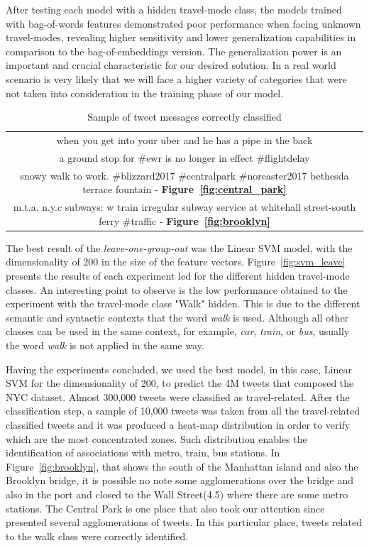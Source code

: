 After testing each model with a hidden travel-mode class, the models trained with bag-of-words features demonstrated poor performance when facing unknown travel-modes, revealing higher sensitivity and lower generalization capabilities in comparison to the bag-of-embeddings version. The generalization power is an important and crucial characteristic for our desired solution. In a real world scenario is very likely that we will face a higher variety of categories that were not taken into consideration in the training phase of our model.

\begin{table}[htbp]
	\centering
	\small
	\caption{Sample of tweet messages correctly classified}
	\label{tab:tweets_examples}
	\begin{tabular}{|c|}
		\hline
		when you get into your uber and he has a pipe in the back \\
		a ground stop for \#ewr is no longer in effect \#flightdelay \\
		snowy walk to work. \#blizzard2017 \#centralpark \#noreaster2017 \@ bethesda terrace fountain -  \textbf{Figure~\ref{fig:central_park}} \\
		m.t.a. n.y.c subways: w train irregular subway service at whitehall street-south ferry \#traffic - \textbf{Figure~\ref{fig:brooklyn}} \\ \hline
	\end{tabular}
\end{table}

The best result of the \emph{leave-one-group-out} was the Linear SVM model, with the dimensionality of 200 in the size of the feature vectors. Figure~\ref{fig:svm_leave} presents the results of each experiment led for the different hidden travel-mode classes. An interesting point to observe is the low performance obtained to the experiment with the travel-mode class "Walk" hidden. This is due to the different semantic and syntactic contexts that the word \emph{walk} is used. Although all other classes can be used in the same context, for example, \emph{car}, \emph{train}, or \emph{bus}, usually the word \emph{walk} is not applied in the same way.

Having the experiments concluded, we used the best model, in this case, Linear SVM for the dimensionality of 200, to predict the 4M tweets that composed the NYC dataset. Almost 300,000 tweets were classified as travel-related. After the classification step, a sample of 10,000 tweets was taken from all the travel-related classified tweets and it was produced a heat-map distribution in order to verify which are the most concentrated zones. Such distribution enables the identification of associations with metro, train, bus stations. In Figure~\ref{fig:brooklyn}, that shows the south of the Manhattan island and also the Brooklyn bridge, it is possible no note some agglomerations over the bridge and also in the port and closed to the Wall Street(4.5) where there are some metro stations. The Central Park is one place that also took our attention since presented several agglomerations of tweets. In this particular place, tweets related to the walk class were correctly identified.

